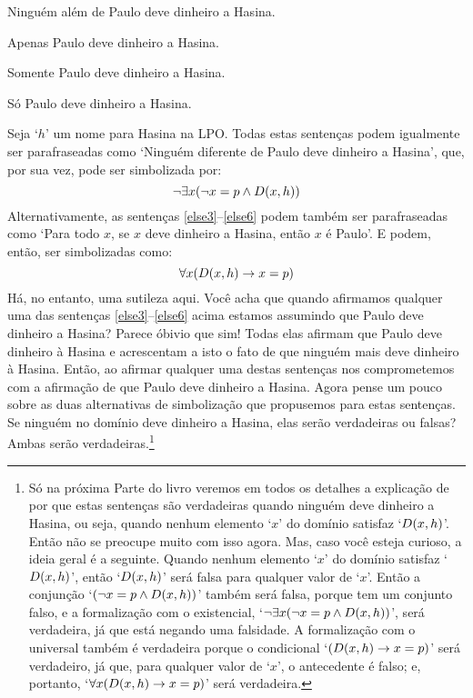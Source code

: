 \begin{earg}
\item[\ex{else3}] Ninguém além de Paulo deve dinheiro a Hasina.
\item[\ex{else4}] Apenas Paulo deve dinheiro a Hasina.
\item[\ex{else5}] Somente Paulo deve dinheiro a Hasina.
\item[\ex{else6}] Só Paulo deve dinheiro a Hasina.
\end{earg}
Seja `$h$' um nome para Hasina na LPO.
Todas estas sentenças podem igualmente ser parafraseadas como
`Ninguém diferente de Paulo deve dinheiro a Hasina', que, por sua vez, pode ser simbolizada por:
$$\neg\exists x(\neg x = p \wedge \mathord{D}(x,h))$$
Alternativamente, as sentenças \ref{else3}--\ref{else6} podem também ser parafraseadas como
`Para todo $x$, se $x$ deve dinheiro a Hasina, então $x$ é Paulo'.
E podem, então, ser simbolizadas como:
$$\forall x (\mathord{D}(x,h) \rightarrow x = p)$$
Há, no entanto, uma sutileza aqui.
Você acha que quando afirmamos qualquer uma das sentenças \ref{else3}--\ref{else6} acima estamos assumindo que Paulo deve dinheiro a Hasina?
Parece óbivio que sim!
Todas elas afirmam que Paulo deve dinheiro à Hasina e acrescentam a isto o fato de que ninguém mais deve dinheiro à Hasina.
Então, ao afirmar qualquer uma destas sentenças nos comprometemos com a afirmação de que Paulo deve dinheiro a Hasina.
Agora pense um pouco sobre as duas alternativas de simbolização que propusemos para estas sentenças.
Se ninguém no domínio deve dinheiro a Hasina, elas serão verdadeiras ou falsas?
Ambas serão verdadeiras.\footnote{
	Só na próxima Parte do livro veremos em todos os detalhes a explicação de por que estas sentenças são verdadeiras quando ninguém deve dinheiro a Hasina, ou seja, quando nenhum elemento `$x$' do domínio satisfaz `$\mathord{D}(x,h)$'.
	Então não se preocupe muito com isso agora.
	Mas, caso você esteja curioso, a ideia geral é a seguinte.
	Quando nenhum elemento `$x$' do domínio satisfaz `$\mathord{D}(x,h)$', então `$\mathord{D}(x,h)$' será falsa para qualquer valor de `$x$'.
	Então a conjunção `$(\neg x = p \wedge \mathord{D}(x,h))$' também será falsa, porque tem um conjunto falso, e a formalização com o existencial, `$\neg\exists x(\neg x = p \wedge \mathord{D}(x,h))$', será verdadeira, já que está negando uma falsidade.
	A formalização com o universal também é verdadeira porque o condicional `$(\mathord{D}(x,h) \rightarrow x = p)$' será verdadeiro, já que, para qualquer valor de `$x$', o antecedente é falso;  e, portanto, `$\forall x (\mathord{D}(x,h) \rightarrow x = p)$' será verdadeira.}	
